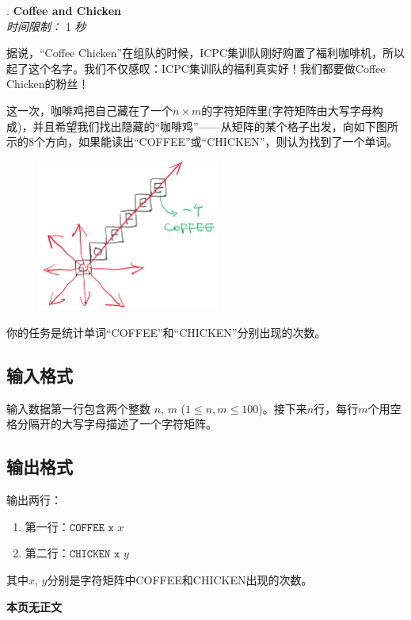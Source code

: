 \addtocounter{ProblemNo}{1}
\renewcommand{\ProblemName}{Coffee and Chicken}
\begin{center}
\huge{. \textbf{\ProblemName}} \\ [0.8cm]
\large{\textit{时间限制：} 1 \textit{秒}} \\ [1cm]
\end{center}

据说，“Coffee Chicken”在组队的时候，ICPC集训队刚好购置了福利咖啡机，所以起了这个名字。我们不仅感叹：ICPC集训队的福利真实好！我们都要做Coffee Chicken的粉丝！

这一次，咖啡鸡把自己藏在了一个$n\times m$的字符矩阵里(字符矩阵由大写字母构成)，并且希望我们找出隐藏的“咖啡鸡”——从矩阵的某个格子出发，向如下图所示的8个方向，如果能读出“COFFEE”或“CHICKEN”，则认为找到了一个单词。

\begin{figure}[h]
  \center
  \includegraphics[width=6cm]{src/coffeechicken/coffeechicken.png}
\end{figure}

你的任务是统计单词“COFFEE”和“CHICKEN”分别出现的次数。

\subsection*{输入格式}

输入数据第一行包含两个整数 $n$, $m$ ($1\le n,m\le 100$)。接下来$n$行，每行$m$个用空格分隔开的大写字母描述了一个字符矩阵。

\subsection*{输出格式}

输出两行：

\begin{enumerate}
\item 第一行：$\texttt{COFFEE x $x$}$
\item 第二行：$\texttt{CHICKEN x $y$}$
\end{enumerate}

其中$x$, $y$分别是字符矩阵中COFFEE和CHICKEN出现的次数。

\setcounter{ExampleNo}{0}


\clearpage

\ifodd\value{page}
\else
    \vspace*{\fill}
    \begin{center}
    \textbf{\Large 本页无正文}
    \end{center}
    \vspace*{\fill}
    \clearpage
\fi

